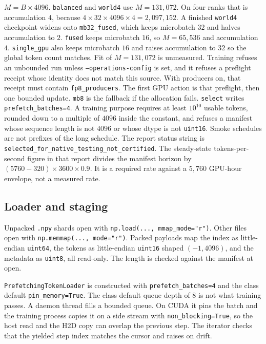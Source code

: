 \documentclass[11pt]{article}
\DeclareRobustCommand{\code}[1]{\texttt{#1}}
\begin{document}
\(M=B\times 4096\). \code{balanced} and \code{world4} use \(M=131{,}072\).
On four ranks that is accumulation \(4\), because
\(4\times 32\times 4096\times 4=2{,}097{,}152\). A finished \code{world4}
checkpoint widens onto \code{mb32\_fused}, which keeps microbatch \(32\) and
halves accumulation to \(2\). \code{fused} keeps microbatch \(16\), so
\(M=65{,}536\) and accumulation \(4\). \code{single\_gpu} also keeps
microbatch \(16\) and raises
accumulation to \(32\) so the global token count matches. Fit of
\(M=131{,}072\) is unmeasured. Training refuses an unbounded run unless
\code{--operations-config} is set, and it refuses a preflight receipt whose
identity does not match this source. With producers on, that receipt must
contain \code{fp8\_producers}. The first GPU action is that preflight, then
one bounded update. \code{mb8} is the fallback if the allocation fails.
\code{select} writes \code{prefetch\_batches=4}. A training purpose requires
at least \(10^{10}\) usable tokens, rounded down to a multiple of \(4096\)
inside the constant, and refuses a manifest whose sequence length is not
\(4096\) or whose dtype is not \code{uint16}. Smoke schedules are not
prefixes of the long schedule. The report status string is
\code{selected\_for\_native\_testing\_not\_certified}. The steady-state
tokens-per-second figure in that report divides the manifest horizon by
\((5760-320)\times 3600\times 0.9\). It is a required rate against a
\(5{,}760\) GPU-hour envelope, not a measured rate.

\subsection{Loader and staging}

Unpacked \code{.npy} shards open with \code{np.load(..., mmap\_mode="r")}.
Other files open with \code{np.memmap(..., mode="r")}. Packed payloads map
the index as little-endian \code{uint64}, the tokens as little-endian
\code{uint16} shaped \((-1, 4096)\), and the metadata as \code{uint8}, all
read-only. The length is checked against the manifest at open.

\code{PrefetchingTokenLoader} is constructed with
\code{prefetch\_batches=4} and the class default \code{pin\_memory=True}.
The class default queue depth of \(8\) is not what training passes. A daemon
thread fills a bounded queue. On CUDA it pins the batch and the training
process copies it on a side stream with \code{non\_blocking=True}, so the
host read and the H2D copy can overlap the previous step. The iterator
checks that the yielded step index matches the cursor and raises on drift.
\end{document}
